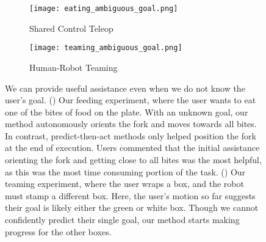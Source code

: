 \begin{figure}[t]
\centering
\begin{subfigure}{0.24\textwidth}
  \texttt{[image: eating\_ambiguous\_goal.png]}
  \caption{Shared Control Teleop}
  \label{subfig:eating_ambiguous_goal}
\end{subfigure}
\hfill
\begin{subfigure}{0.24\textwidth}
  \texttt{[image: teaming\_ambiguous\_goal.png]}
  \caption{Human-Robot Teaming}
  \label{subfig:teaming_ambiguous_goal}
\end{subfigure}
\caption{We can provide useful assistance even when we do not know the user's goal. () Our feeding experiment, where the user wants to eat one of the bites of food on the plate. With an unknown goal, our method autonomously orients the fork and moves towards all bites. In contrast, predict-then-act methods only helped position the fork at the end of execution. Users commented that the initial assistance orienting the fork and getting close to all bites was the most helpful, as this was the most time consuming portion of the task. () Our teaming experiment, where the user wraps a box, and the robot must stamp a different box. Here, the user's motion so far suggests their goal is likely either the green or white box. Though we cannot confidently predict their single goal, our method starts making progress for the other boxes.}
 \label{fig:ambiguous_goals}
\end{figure} 





